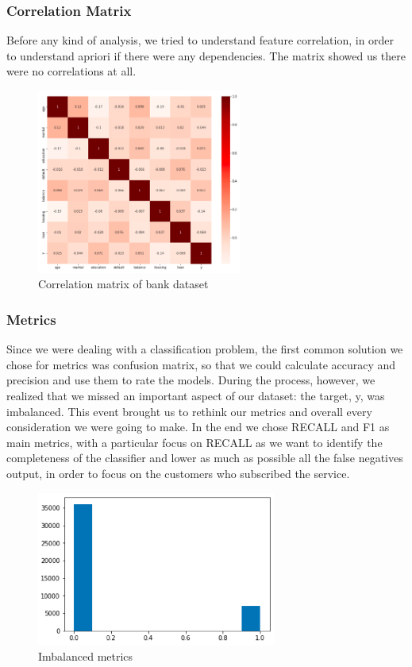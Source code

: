 \subsubsection{Correlation Matrix}
Before any kind of analysis, we tried to understand feature correlation, in order to understand apriori if there were any dependencies. The matrix showed us there were no correlations at all.
\begin{figure}[H]
\centering
\includegraphics[width=0.6\textwidth]{Img/correlation_bank.png}
\caption{Correlation matrix of bank dataset}
\end{figure}
\vspace{-1cm}
\subsubsection{Metrics}
Since we were dealing with a classification problem, the first common solution we chose for metrics was confusion matrix, so that we could calculate accuracy and precision and use them to rate the models. During the process, however, we realized that we missed an important aspect of our dataset: the target, y, was imbalanced.
This event brought us to rethink our metrics and overall every consideration we were going to make. In the end we chose RECALL and F1 as main metrics, with a particular focus on RECALL as we want to identify the completeness of the classifier and lower as much as possible all the false negatives output, in order to focus on the customers who subscribed the service. 

\begin{figure}[H]
\centering
\includegraphics[width=0.7\textwidth]{Img/imbalanced.png}
\caption{Imbalanced metrics}
\end{figure}
\clearpage
